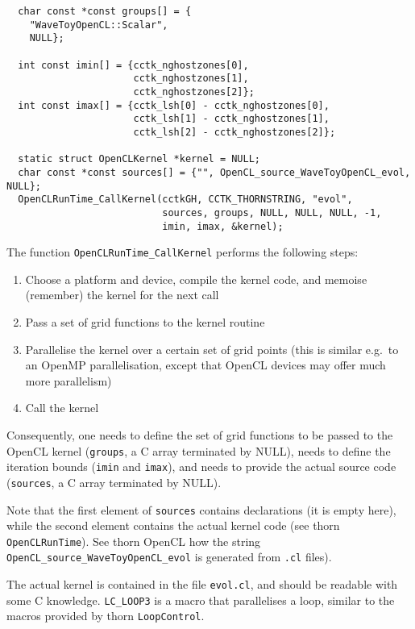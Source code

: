 \begin{verbatim}
  char const *const groups[] = {
    "WaveToyOpenCL::Scalar",
    NULL};
  
  int const imin[] = {cctk_nghostzones[0],
                      cctk_nghostzones[1],
                      cctk_nghostzones[2]};
  int const imax[] = {cctk_lsh[0] - cctk_nghostzones[0],
                      cctk_lsh[1] - cctk_nghostzones[1],
                      cctk_lsh[2] - cctk_nghostzones[2]};
  
  static struct OpenCLKernel *kernel = NULL;
  char const *const sources[] = {"", OpenCL_source_WaveToyOpenCL_evol, NULL};
  OpenCLRunTime_CallKernel(cctkGH, CCTK_THORNSTRING, "evol",
                           sources, groups, NULL, NULL, NULL, -1,
                           imin, imax, &kernel);
\end{verbatim}

The function \texttt{OpenCLRunTime\_CallKernel} performs the following
steps:
\begin{enumerate}
\item Choose a platform and device, compile the kernel code, and
  memoise (remember) the kernel for the next call
\item Pass a set of grid functions to the kernel routine
\item Parallelise the kernel over a certain set of grid points (this
  is similar e.g.\ to an OpenMP parallelisation, except that OpenCL
  devices may offer much more parallelism)
\item Call the kernel
\end{enumerate}
Consequently, one needs to define the set of grid functions to be
passed to the OpenCL kernel (\texttt{groups}, a C array terminated by
NULL), needs to define the iteration bounds (\texttt{imin} and
\texttt{imax}), and needs to provide the actual source code
(\texttt{sources}, a C array terminated by NULL\@).

Note that the first element of \texttt{sources} contains declarations
(it is empty here), while the second element contains the actual
kernel code (see thorn \texttt{OpenCLRunTime}). See thorn OpenCL how
the string \texttt{OpenCL\_source\_WaveToyOpenCL\_evol} is generated
from \texttt{.cl} files).

The actual kernel is contained in the file \texttt{evol.cl}, and
should be readable with some C knowledge. \texttt{LC\_LOOP3} is a
macro that parallelises a loop, similar to the macros provided by
thorn \texttt{LoopControl}.



% 



